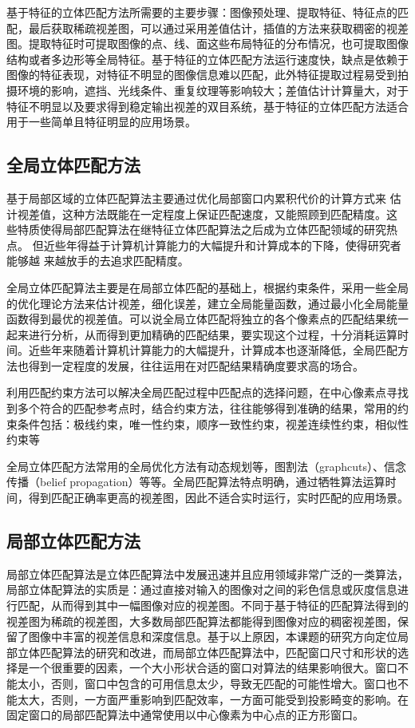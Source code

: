 基于特征的立体匹配方法所需要的主要步骤：图像预处理、提取特征、特征点的匹配，最后获取稀疏视差图，可以通过采用差值估计，插值的方法来获取稠密的视差图。提取特征时可提取图像的点、线、面这些布局特征的分布情况，也可提取图像结构或者多边形等全局特征。基于特征的立体匹配方法运行速度快，缺点是依赖于图像的特征表现，对特征不明显的图像信息难以匹配，此外特征提取过程易受到拍摄环境的影响，遮挡、光线条件、重复纹理等影响较大；差值估计计算量大，对于特征不明显以及要求得到稳定输出视差的双目系统，基于特征的立体匹配方法适合用于一些简单且特征明显的应用场景。

\subsection{全局立体匹配方法}
基于局部区域的立体匹配算法主要通过优化局部窗口内累积代价的计算方式来
估计视差值，这种方法既能在一定程度上保证匹配速度，又能照顾到匹配精度。这
些特质使得局部匹配算法在继特征立体匹配算法之后成为立体匹配领域的研究热点。
但近些年得益于计算机计算能力的大幅提升和计算成本的下降，使得研究者能够越
来越放手的去追求匹配精度。

全局立体匹配算法主要是在局部立体匹配的基础上，根据约束条件，采用一些全局的优化理论方法来估计视差，细化误差，建立全局能量函数，通过最小化全局能量函数得到最优的视差值。可以说全局立体匹配将独立的各个像素点的匹配结果统一起来进行分析，从而得到更加精确的匹配结果，要实现这个过程，十分消耗运算时间。近些年来随着计算机计算能力的大幅提升，计算成本也逐渐降低，全局匹配方法也得到一定程度的发展，往往运用在对匹配结果精确度要求高的场合。

利用匹配约束方法可以解决全局匹配过程中匹配点的选择问题，在中心像素点寻找到多个符合的匹配参考点时，结合约束方法，往往能够得到准确的结果，常用的约束条件包括：极线约束，唯一性约束，顺序一致性约束，视差连续性约束，相似性约束等

全局立体匹配方法常用的全局优化方法有动态规划等，图割法（graphcuts）、信念传播（belief propagation）等等。全局匹配算法特点明确，通过牺牲算法运算时间，得到匹配正确率更高的视差图，因此不适合实时运行，实时匹配的应用场景。

\subsection{局部立体匹配方法}
局部立体匹配算法是立体匹配算法中发展迅速并且应用领域非常广泛的一类算法，局部立体配算法的实质是：通过直接对输入的图像对之间的彩色信息或灰度信息进行匹配，从而得到其中一幅图像对应的视差图。不同于基于特征的匹配算法得到的视差图为稀疏的视差图，大多数局部匹配算法都能得到图像对应的稠密视差图，保留了图像中丰富的视差信息和深度信息。基于以上原因，本课题的研究方向定位局部立体匹配算法的研究和改进，而局部立体匹配算法中，匹配窗口尺寸和形状的选择是一个很重要的因素，一个大小形状合适的窗口对算法的结果影响很大。窗口不能太小，否则，窗口中包含的可用信息太少，导致无匹配的可能性增大。窗口也不能太大，否则，一方面严重影响到匹配效率，一方面可能受到投影畸变的影响。在固定窗口的局部匹配算法中通常使用以中心像素为中心点的正方形窗口。

